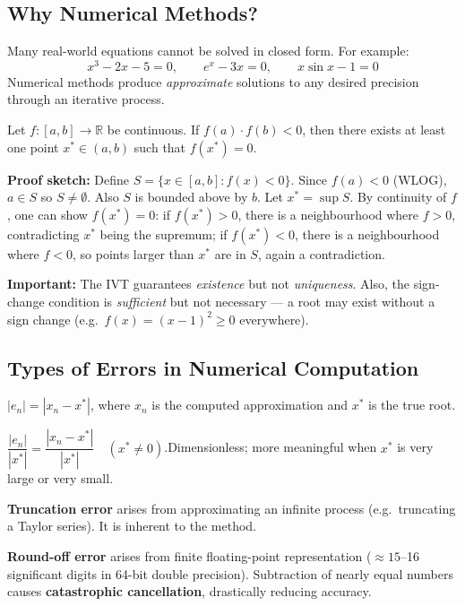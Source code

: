 \documentclass[12pt]{article}
\begin{document}
\bigskip

\subsection*{Why Numerical Methods?}

Many real-world equations cannot be solved in closed form. For example:
\[
  x^3 - 2x - 5 = 0, \qquad e^x - 3x = 0, \qquad x\sin x - 1 = 0
\]
Numerical methods produce \textit{approximate} solutions to any desired precision through an iterative process.

\bigskip

\begin{thmbox}
Let $f:[a,b]\to\mathbb{R}$ be continuous. If $f(a)\cdot f(b)<0$, then there exists at least one point $x^*\in(a,b)$ such that $f(x^*)=0$.

\medskip
\textbf{Proof sketch:} Define $S=\{x\in[a,b]:f(x)<0\}$. Since $f(a)<0$ (WLOG), $a\in S$ so $S\neq\emptyset$. Also $S$ is bounded above by $b$. Let $x^*=\sup S$. By continuity of $f$, one can show $f(x^*)=0$: if $f(x^*)>0$, there is a neighbourhood where $f>0$, contradicting $x^*$ being the supremum; if $f(x^*)<0$, there is a neighbourhood where $f<0$, so points larger than $x^*$ are in $S$, again a contradiction.

\medskip
\textbf{Important:} The IVT guarantees \textit{existence} but not \textit{uniqueness}. Also, the sign-change condition is \textit{sufficient} but not necessary — a root may exist without a sign change (e.g.\ $f(x)=(x-1)^2\geq 0$ everywhere).
\end{thmbox}

\bigskip

\subsection*{Types of Errors in Numerical Computation}

\begin{defbox}
$|e_n| = |x_n - x^*|$, where $x_n$ is the computed approximation and $x^*$ is the true root.
\end{defbox}

\begin{defbox}
$\dfrac{|e_n|}{|x^*|} = \dfrac{|x_n - x^*|}{|x^*|}\quad(x^*\neq 0)$.\quad Dimensionless; more meaningful when $x^*$ is very large or very small.
\end{defbox}

\begin{defbox}
\textbf{Truncation error} arises from approximating an infinite process (e.g.\ truncating a Taylor series). It is inherent to the method.

\medskip
\textbf{Round-off error} arises from finite floating-point representation ($\approx 15$--16 significant digits in 64-bit double precision). Subtraction of nearly equal numbers causes \textbf{catastrophic cancellation}, drastically reducing accuracy.
\end{defbox}
\end{document}
